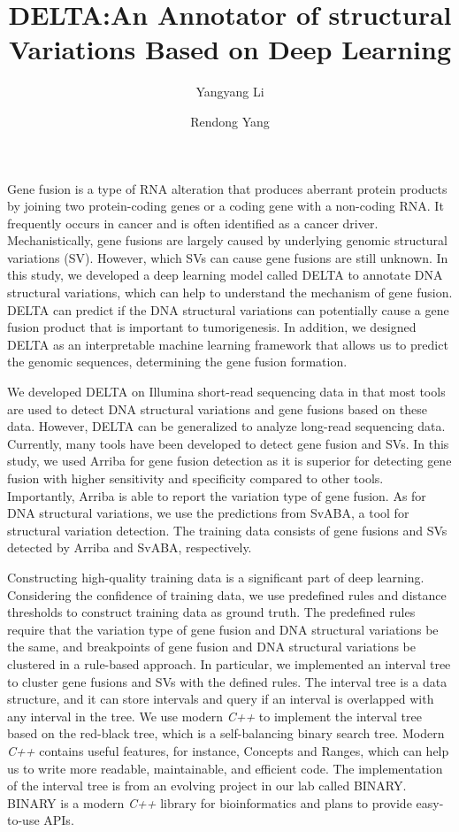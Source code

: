 \documentclass{article}
\title{DELTA:An Annotator of structural Variations Based on Deep Learning}
\author[1]{Yangyang Li}
\author[1]{Rendong Yang}
\affil[1]{\small Department of Urology, Northwestern University Feinberg School of Medicine, Chicago, IL 60611,
USA.}
\begin{document}
\maketitle



Gene fusion is a type of RNA alteration that produces aberrant protein products by joining two protein-coding genes or a coding gene with a non-coding RNA\@.
It frequently occurs in cancer and is often identified as a cancer driver.
Mechanistically, gene fusions are largely caused by underlying genomic structural variations (SV).
However, which SVs can cause gene fusions are still unknown.
In this study, we developed a deep learning model called DELTA to annotate DNA structural variations, which can help to understand the mechanism of gene fusion.
DELTA can predict if the DNA structural variations can potentially cause a gene fusion product that is important to tumorigenesis.
In addition, we designed DELTA as an interpretable machine learning framework that allows us to predict the genomic sequences, determining the gene fusion formation.


We developed DELTA on Illumina short-read sequencing data in that most tools are used to detect DNA structural variations and gene fusions based on these data.
However, DELTA can be generalized to analyze long-read sequencing data.
Currently, many tools have been developed to detect gene fusion and SVs.
In this study, we used Arriba for gene fusion detection as it is superior for detecting gene fusion with higher sensitivity and specificity compared to other tools. 
Importantly, Arriba is able to report the variation type of gene fusion.
As for DNA structural variations, we use the predictions from SvABA, a tool for structural variation detection.
The training data consists of gene fusions and SVs detected by Arriba and SvABA, respectively\@.

Constructing high-quality training data is a significant part of deep learning.
Considering the confidence of training data, we use predefined rules and distance thresholds to construct training data as ground truth.
The predefined rules require that the variation type of gene fusion and DNA structural variations be the same, and breakpoints of gene fusion and DNA structural variations be clustered in a rule-based approach.
In particular, we implemented an interval tree to cluster gene fusions and SVs with the defined rules.
The interval tree is a data structure, and it can store intervals and query if an interval is overlapped with any interval in the tree.
We use modern \textit{C++} to implement the interval tree based on the red-black tree, which is a self-balancing binary search tree.
Modern \textit{C++} contains useful features, for instance, Concepts and Ranges, which can help us to write more readable, maintainable, and efficient code.
The implementation of the interval tree is from an evolving project in our lab called BINARY.
BINARY is a modern \textit{C++} library for bioinformatics and plans to provide easy-to-use APIs\@.
\end{document}
